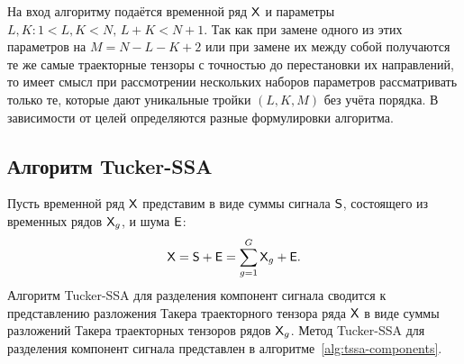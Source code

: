 \documentclass[specialist,
  substylefile = spbu.rtx,
subf,href,colorlinks=true, 12pt]{disser}
\theoremstyle{plain}
\theoremstyle{definition}
\theoremstyle{remark}
\def\tssa/{Tucker-SSA}
\begin{document}
На вход алгоритму подаётся временной ряд $\mathsf{X}$ и параметры $L,K: 1<
L,K < N,\, L + K < N + 1$.
Так как при замене одного из этих параметров на $M=N-L-K+2$ или при
замене их между собой получаются
те же самые траекторные тензоры с точностью до перестановки их
направлений, то имеет смысл при
рассмотрении нескольких наборов параметров рассматривать только те,
которые дают уникальные тройки $(L, K, M)$
без учёта порядка.
В зависимости от целей определяются разные формулировки алгоритма.

\subsection{Алгоритм \tssa/}\label{subsec:tssa-alg}
Пусть временной ряд $\mathsf{X}$ представим в виде суммы сигнала $\mathsf{S}$, состоящего
из временных рядов $\mathsf{X}_g$, и шума $\mathsf{E}$:
\[
  \mathsf{X} = \mathsf{S} + \mathsf{E} = \sum_{g=1}^{G} \mathsf{X}_g + \mathsf{E}.
\]
Алгоритм \tssa/ для разделения компонент сигнала сводится к
представлению разложения Такера траекторного тензора ряда
$\mathsf{X}$ в виде суммы разложений Такера траекторных тензоров рядов $\mathsf{X}_g$.
Метод \tssa/ для разделения компонент сигнала представлен в
алгоритме~\ref{alg:tssa-components}.
\end{document}
